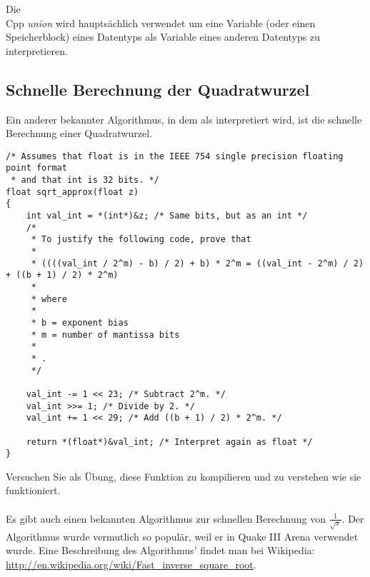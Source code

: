 
Die \\Cpp \emph{union} wird hauptsächlich verwendet um eine Variable (oder einen Speicherblock) eines Datentyps als
Variable eines anderen Datentyps zu interpretieren.





\subsection{Schnelle Berechnung der Quadratwurzel}

Ein anderer bekannter Algorithmus, in dem \Tfloat als \Tint interpretiert wird, ist die schnelle Berechnung einer
Quadratwurzel.

\begin{lstlisting}[caption=Quellcode stammt aus der Wikipedia: \url{https://en.wikipedia.org/wiki/Methods_of_computing_square_roots},style=customc]
/* Assumes that float is in the IEEE 754 single precision floating point format
 * and that int is 32 bits. */
float sqrt_approx(float z)
{
    int val_int = *(int*)&z; /* Same bits, but as an int */
    /*
     * To justify the following code, prove that
     *
     * ((((val_int / 2^m) - b) / 2) + b) * 2^m = ((val_int - 2^m) / 2) + ((b + 1) / 2) * 2^m)
     *
     * where
     *
     * b = exponent bias
     * m = number of mantissa bits
     *
     * .
     */
 
    val_int -= 1 << 23; /* Subtract 2^m. */
    val_int >>= 1; /* Divide by 2. */
    val_int += 1 << 29; /* Add ((b + 1) / 2) * 2^m. */
 
    return *(float*)&val_int; /* Interpret again as float */
}
\end{lstlisting}

Versuchen Sie als Übung, diese Funktion zu kompilieren und zu verstehen wie sie funktioniert.\\\\
Es gibt auch einen bekannten Algorithmus zur schnellen Berechnung von $\frac{1}{\sqrt{x}}$.
Der Algorithmus wurde vermutlich so populär, weil er in Quake III Arena verwendet wurde.
Eine Beschreibung des Algorithmus' findet man bei Wikipedia: \url{http://en.wikipedia.org/wiki/Fast_inverse_square_root}.
